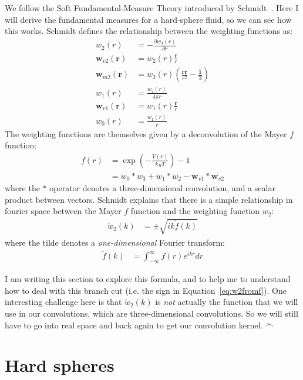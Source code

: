 \documentclass[letterpaper,twocolumn,amsmath,amssymb,prb]{revtex4-1}
\newcommand{\rr}{\textbf{r}}
\begin{document}
We follow the Soft Fundamental-Measure Theory introduced by
Schmidt~\cite{schmidt2000fluid}.  Here I will derive the fundamental
measures for a hard-sphere fluid, so we can see how this works.
Schmidt defines the relationship between the weighting functions as:
\begin{align}
  w_2(r) &= -\frac{\partial w_3(r)}{\partial r} \\
  \mathbf{w}_{v2}(\rr) &= w_2(r)\frac{\rr}{r} \\
  \mathbf{w}_{m2}(\rr) &= w_2(r)\left( \frac{\rr \rr}{r^2}
                              - \frac{\mathbf{\hat{1}}}{3} \right) \\
  w_1(r) &= \frac{w_2(r)}{4\pi r} \\
  \mathbf{w}_{v1}(\rr) &= w_1(r) \frac{\rr}{r} \\
  w_0(r) &= \frac{w_1(r)}{r}
\end{align}
The weighting functions are themselves given by a deconvolution of the
Mayer $f$ function:
\begin{align}
  f(r) &= \exp\left(-\frac{V(r)}{k_BT}\right) - 1 \\
  &= w_0 * w_3 + w_1 * w_2 - \mathbf{w}_{v1} * \mathbf{w}_{v2}
\end{align}
where the $*$ operator denotes a three-dimensional convolution, and a
scalar product between vectors.  Schmidt explains that there is a
simple relationship in fourier space between the Mayer $f$ function
and the weighting function $w_2$:
\begin{align}
  \tilde{w}_2(k) &= \pm \sqrt{ik\tilde{f}(k)}
  \label{eq:w2fromf}
\end{align}
where the tilde denotes a \emph{one-dimensional} Fourier transform:
\begin{align}
  \tilde{f}(k) &= \int_{-\infty}^\infty f(r) e^{ikr} dr
\end{align}

I am writing this section to explore this formula, and to help me to
understand how to deal with this branch cut (i.e. the sign in
Equation~\ref{eq:w2fromf}).  One interesting challenge here is that
$\tilde{w}_2(k)$ is \emph{not} actually the function that we will use
in our convolutions, which are three-dimensional convolutions.  So we
will still have to go into real space and back again to get our
convolution kernel.  $\ddot\frown$

\section{Hard spheres}
\end{document}
